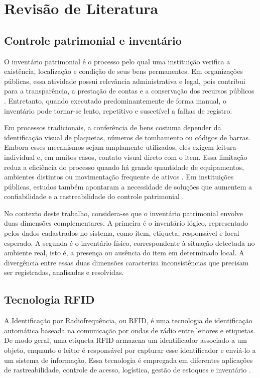 \chapter{Revisão de Literatura}
\label{capII_refTeo}

\section{Controle patrimonial e inventário}

O inventário patrimonial é o processo pelo qual uma instituição verifica a existência, localização e condição de seus bens permanentes. Em organizações públicas, essa atividade possui relevância administrativa e legal, pois contribui para a transparência, a prestação de contas e a conservação dos recursos públicos \cite{tceba2018}. Entretanto, quando executado predominantemente de forma manual, o inventário pode tornar-se lento, repetitivo e suscetível a falhas de registro.

Em processos tradicionais, a conferência de bens costuma depender da identificação visual de plaquetas, números de tombamento ou códigos de barras. Embora esses mecanismos sejam amplamente utilizados, eles exigem leitura individual e, em muitos casos, contato visual direto com o item. Essa limitação reduz a eficiência do processo quando há grande quantidade de equipamentos, ambientes distintos ou movimentação frequente de ativos \cite{oliveira2021}. Em instituições públicas, estudos também apontaram a necessidade de soluções que aumentem a confiabilidade e a rastreabilidade do controle patrimonial \cite{brito2019}.

No contexto deste trabalho, considera-se que o inventário patrimonial envolve duas dimensões complementares. A primeira é o inventário lógico, representado pelos dados cadastrados no sistema, como item, etiqueta, responsável e local esperado. A segunda é o inventário físico, correspondente à situação detectada no ambiente real, isto é, a presença ou ausência do item em determinado local. A divergência entre essas duas dimensões caracteriza inconsistências que precisam ser registradas, analisadas e resolvidas.

\section{Tecnologia RFID}

A Identificação por Radiofrequência, ou RFID, é uma tecnologia de identificação automática baseada na comunicação por ondas de rádio entre leitores e etiquetas. De modo geral, uma etiqueta RFID armazena um identificador associado a um objeto, enquanto o leitor é responsável por capturar esse identificador e enviá-lo a um sistema de informação. Essa tecnologia é empregada em diferentes aplicações de rastreabilidade, controle de acesso, logística, gestão de estoques e inventário \cite{ting2013,alwadi2017}.

